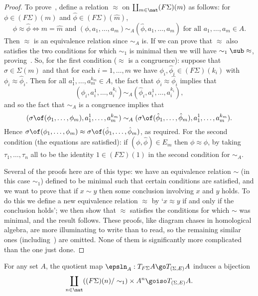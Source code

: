 \begin{proof}
To prove~, define a relation $\approx$ on
$\coprod_{m\in\nat} (F\Sigma)(m)$ as follows: for $\phi\in(F\Sigma)(m)$ and
$\hat{\phi} \in (F\Sigma)(\hat{m})$,
\[
\phi \approx \hat{\phi}
\iff
m = \hat{m} 
\textrm{ and }
(\phi, a_1, \ldots, a_m) \sim_A (\hat{\phi}, a_1, \ldots, a_m)
\textrm{ for all }
a_1, \ldots, a_m \in A.
\]
Then $\approx$ is an equivalence relation since $\sim_A$ is.  If we can
prove that $\approx$ also satisfies the two conditions for which $\sim_1$
is minimal then we will have $\sim_1 \sub \approx$,
proving~.  So, for the first condition ($\approx$ is a
congruence): suppose that $\sigma\in\Sigma(m)$ and that for each $i=1,
\ldots, m$ we have $\phi_i, \hat{\phi}_i \in (F\Sigma)(k_i)$ with $\phi_i
\approx \hat{\phi}_i$.  Then for all $a_1^1, \ldots, a_m^{k_m} \in A$, the
fact that $\phi_i \approx \hat{\phi}_i$ implies that
\[
(\phi_i, a_i^1, \ldots, a_i^{k_i}) 
\sim_A
(\hat{\phi}_i, a_i^1, \ldots, a_i^{k_i}),
\]
and so the fact that $\sim_A$ is a congruence implies that
\[
(\sigma\of(\phi_1, \ldots, \phi_m), a_1^1, \ldots, a_m^{k_m})
\sim_A
(\sigma\of(\hat{\phi}_1, \ldots, \hat{\phi}_m), a_1^1, \ldots, a_m^{k_m}).
\]
Hence $\sigma\of(\phi_1, \ldots, \phi_m) \approx \sigma\of(\hat{\phi}_1,
\ldots, \hat{\phi}_m)$, as required.  For the second condition (the
equations are satisfied): if $(\phi, \hat{\phi}) \in E_m$ then
$\phi\approx\hat{\phi}$, by taking $\tau_1, \ldots, \tau_n$ all to be the
identity $1 \in (F\Sigma)(1)$ in the second condition for $\sim_A$.  

Several of the proofs here are of this type: we have an equivalence
relation $\sim$ (in this case $\sim_1$) defined to be minimal such that
certain conditions are satisfied, and we want to prove that if $x \sim y$
then some conclusion involving $x$ and $y$ holds.  To do this we define a
new equivalence relation $\approx$ by `$x \approx y$ if and only if the
conclusion holds'; we then show that $\approx$ satisfies the conditions for
which $\sim$ was minimal, and the result follows.  These proofs, like
diagram chases in homological algebra, are more illuminating to write than
to read, so the remaining similar ones (including~) are
omitted.  None of them is significantly more complicated than the one
just done.  
\done
\end{proof}

\begin{cor}	
For any set $A$, the quotient map $\epsln_A: T_{F\Sigma}A \go T_{(\Sigma,
E)}A$ induces a bijection 
\[
\coprod_{n\in\nat} ((F\Sigma)(n)/\sim_1) \times A^n
\goiso
T_{(\Sigma,E)}A.
\]
\ \done
\end{cor}

